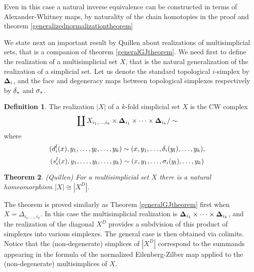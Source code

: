 \documentclass[a4paper,11pt]{article}
\newtheorem{theorem}{Theorem}[section]
\newtheorem{corollary}[theorem]{Corollary}
\theoremstyle{remark}
\newtheorem{observation}[theorem]{\textbf{Observation}}
\theoremstyle{definition}
\newtheorem{definition}[theorem]{Definition}
\begin{document}
Even in this case a natural inverse  equivalence can be constructed in terms of Alexander-Whitney maps,
by naturality of the chain homotopies  in the proof \cite{GJ} and theorem 
\ref{generalizednormalizationtheorem} 







We state next an important result by Quillen about realizations of multisimplicial sets, that is a companion of theorem 
\ref{generalGJtheorem}.
We need first to define the realization of a multisimplicial set $X$, that is the natural generalization of the realization of a simplicial set.
Let us denote the standard topological $i$-simplex by ${\bf \Delta}_i$, and the face and degeneracy
maps between topological simplexes respectively by ${\bf \delta}_*$ and ${\bf \sigma}_*$. %
\begin{definition}
The realization $|X|$ of a $k$-fold simplicial set $X$ is the CW complex 
$$\coprod X_{i_1,\dots,i_k} \times {\bf \Delta}_{i_1} \times \dots \times {\bf \Delta}_{i_k} /\sim$$
where $$(d_i^l(x),y_1,\dots,y_l,\dots,y_k ) \sim (x,y_1,\dots, {\bf \delta}_i(y_l),\dots, y_k),$$ 
$$(s^l_i(x),y_1,\dots,y_l,\dots,y_k) \sim (x,y_1,\dots,{\bf \sigma}_i(y_l),\dots,y_k)$$
\end{definition}


\begin{theorem} (Quillen) \cite{Quillen}
For a multisimplicial set $X$
there is a natural homeomorphism 
$|X| \cong |X^D|$.
\end{theorem}
The theorem is proved similarly as Theorem \ref{generalGJtheorem}
first when $X=\Delta_{i_1,\dots,i_k}$. In this case the multisimplicial realization is ${\bf \Delta}_{i_1} \times \dots \times {\bf \Delta}_{i_k}$,
and the realization of the diagonal $X^D$  provides a subdvision of this product of simplexes into various simplexes. 
The general case is then obtained via colimits. Notice that the (non-degenerate) simplices of $|X^D|$ correspond to the 
summands appearing in the formula of the normalized Eilenberg-Zilber map applied to the (non-degenerate) multisimplices of $X$. 
\end{document}
